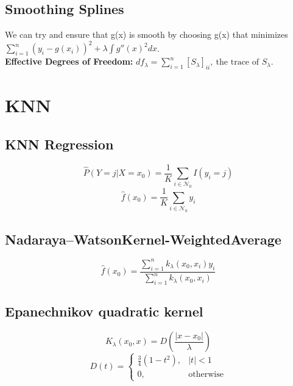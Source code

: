 \documentclass[a4paper,9pt,fleqn]{extarticle}
\begin{document}
\subsection*{Smoothing Splines}
We can try and ensure that g(x) is smooth by choosing g(x) that minimizes
\(
    \sum_{i=1}^{n}(y_i - g(x_i))^2 + \lambda \int g''(x)^2 dx
\).\\
\textbf{Effective Degrees of Freedom: }
\(
    df_{\lambda} = \sum_{i = 1}^{n}[S_\lambda]_{ii}, \ \text{the trace of } S_\lambda.
\)

\section{KNN}

\begin{minipage}[t]{0.3\textwidth}
\subsection*{KNN Regression}
\[
    \hat{P}(Y = j | X = x_0) = \frac{1}{K} \sum_{i \in \mathcal{N}_0}I(y_i = j) 
\]
\[ 
    \hat{f}(x_0) = \frac{1}{K} \sum_{i \in \mathcal{N}_0}y_i
\]
\end{minipage}
\hfill
\begin{minipage}[t]{0.32\textwidth}
\subsection*{Nadaraya–WatsonKernel-WeightedAverage}
\[
\hat{f}(x_0) = \frac{\sum_{i=1}^{n}k_{\lambda}(x_0 , x_i)y_i}{\sum_{i=1}^{n}k_{\lambda}(x_0 , x_i)} 
\]
\end{minipage}
\hfill
\begin{minipage}[t]{0.32\textwidth}
\subsection*{Epanechnikov quadratic kernel}
\[
    K_{\lambda}(x_0, x) = D\left(\frac{\vert x - x_0 \vert}{\lambda}\right) 
\]
\[
    D(t) = \begin{cases}
        \frac{3}{4}(1 - t^2), & \vert t \vert < 1 \\
        0, & \text{otherwise}
    \end{cases}
\]
\end{minipage}
\end{document}
